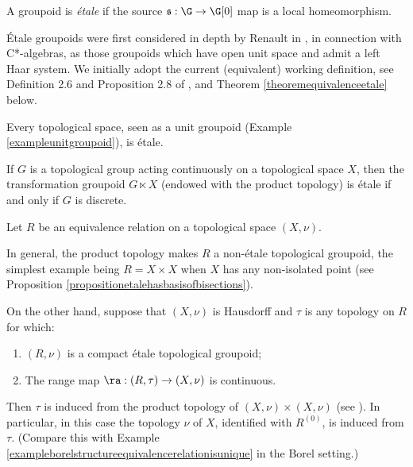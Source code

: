 \begin{definition}\label{definitionetalegroupoid}
A groupoid is \emph{étale} if the source $\mathfrak{s}:\G\to\G[0]$ map is a local homeomorphism.
\end{definition}

Étale groupoids were first considered in depth by Renault in \cite{MR584266}, in connection with C*-algebras, as those groupoids which have open unit space and admit a left Haar system. We initially adopt the current (equivalent) working definition, see Definition 2.6 and Proposition 2.8 of \cite{MR584266}, and Theorem \ref{theoremequivalenceetale} below.

\begin{example}
Every topological space, seen as a unit groupoid (Example \ref{exampleunitgroupoid}), is étale.
\end{example}

\begin{example}
If $G$ is a topological group acting continuously on a topological space $X$, then the transformation groupoid $G\ltimes X$ (endowed with the product topology) is étale if and only if $G$ is discrete.
\end{example}

\begin{example}\label{exampleequivalencerelationisnotetalewithproducttopology}
Let $R$ be an equivalence relation on a topological space $(X,\nu)$.

In general, the product topology makes $R$ a non-étale topological groupoid, the simplest example being $R=X\times X$ when $X$ has any non-isolated point (see Proposition \ref{propositionetalehasbasisofbisections}).

On the other hand, suppose that $(X,\nu)$ is Hausdorff and $\tau$ is any topology on $R$ for which:
\begin{enumerate}
\item[(i)] $(R,\nu)$ is a compact étale topological groupoid;
\item[(ii)] The range map $\ra:(R,\tau)\to(X,\nu)$ is continuous.
\end{enumerate}
Then $\tau$ is induced from the product topology of $(X,\nu)\times(X,\nu)$ (see \cite[Proposition 3.2]{MR2054051}). In particular, in this case the topology $\nu$ of $X$, identified with $R^{(0)}$, is induced from $\tau$. (Compare this with Example \ref{exampleborelstructureequivalencerelationisunique} in the Borel setting.)
\end{example}

